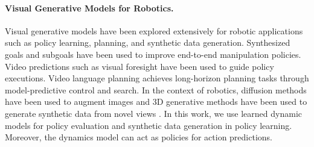\paragraph{Visual Generative Models for Robotics.}
Visual generative models have been explored extensively for robotic applications such as policy learning, planning, and synthetic data generation. Synthesized goals and subgoals \cite{du2023video,nair2018visual} have been used to improve end-to-end manipulation policies. Video predictions such as visual foresight \cite{finn2017deep} have been used to guide policy executions. Video language planning \cite{du2023video} achieves long-horizon planning tasks through model-predictive control and search. In the context of robotics, diffusion methods have been used to augment images 
 \cite{chen2023genaug,yu2023scaling} and 3D generative methods have been used to generate synthetic data from novel views \cite{zhou2023nerf}. In this work, we use learned dynamic models for policy evaluation and synthetic data generation in policy learning.  Moreover, the dynamics model can act as policies for action predictions.